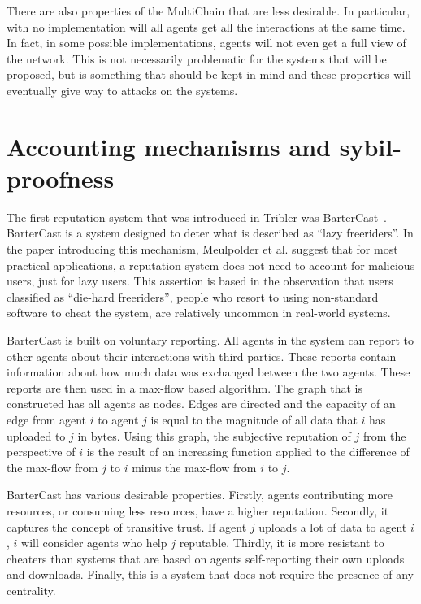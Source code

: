 \documentclass[a4paper,11pt]{book}
\theoremstyle{definition}
\begin{document}
There are also properties of the MultiChain that are less desirable. In particular, with no implementation
will all agents get all the interactions at the same time. In fact, in some possible implementations, 
agents will not even get a full view of the network. This is not necessarily problematic for the systems
that will be proposed, but is something that should be kept in mind and these properties will eventually
give way to attacks on the systems. 


\chapter{Accounting mechanisms and sybil-proofness}
\label{chap:netflow}

The first reputation system that was introduced in Tribler was BarterCast~\cite{meulpolder2009bartercast}.
BarterCast is a system designed to deter what is described as ``lazy freeriders''.
In the paper introducing this mechanism, Meulpolder et al. suggest that for most practical applications, 
a reputation system does not
need to account for malicious users, just for lazy users. This assertion is based in the observation
that users classified as ``die-hard freeriders'', people who resort to using non-standard software to
cheat the system, are relatively uncommon in real-world systems. 

BarterCast is built on voluntary reporting. All agents in the system can report to other agents
about their interactions with third parties. These reports contain information about how much data
was exchanged between the two agents. These reports are then used in a max-flow based algorithm.
The graph that is constructed has all agents as nodes. Edges are directed and the capacity
of an edge from agent $i$ to agent $j$ is equal to the magnitude of all data that $i$ has
uploaded to $j$ in bytes. Using this graph, the subjective reputation of $j$ from the perspective
of $i$ is the result of an increasing function applied to the difference of the max-flow from $j$ to $i$
minus the max-flow from $i$ to $j$.

BarterCast has various desirable properties. Firstly, agents contributing more resources, or consuming
less resources, have a higher reputation. Secondly, it captures the concept of transitive trust. If agent
$j$ uploads a lot of data to agent $i$, $i$ will consider agents who help $j$ reputable. Thirdly,
it is more resistant to cheaters than systems that are based on agents self-reporting their own uploads and
downloads. Finally, this is a system that does not require the presence of any centrality. 
\end{document}
